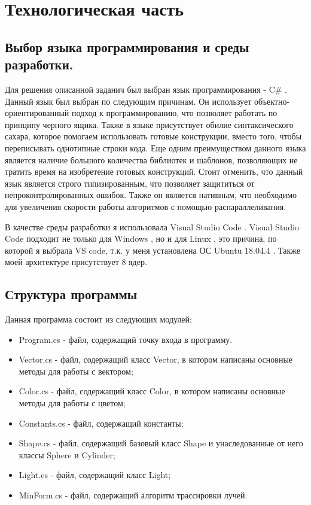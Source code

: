 \chapter{Технологическая часть}

\section{Выбор языка программирования и среды разработки.}

Для решения описанной заданич был выбран язык программирования - C\# \cite{Microsoft}.
Данный язык был выбран по следующим причинам.
Он использует объектно-ориентированный подход к программированию,
что позволяет работать по принципу черного ящика.
Также в языке присутствует обилие синтаксического сахара,
которое помогаем использовать готовые конструкции,
вместо того, чтобы переписывать однотипные строки кода.
Еще одним преимуществом данного языка является
наличие большого количества библиотек и шаблонов,
позволяющих не тратить время на изобретение готовых конструкций.
Стоит отменить, что данный язык является строго типизированным,
что позволяет защититься от непроконтролированных ошибок.
Также он является нативным, что необходимо
для увеличения скорости работы алгоритмов с помощью распараллеливания.

В качестве среды разработки я использовала Visual Studio Code \cite{Vs}.
Visual Studio Code подходит не только для  Windows \cite{Win},
но и для Linux \cite{Lin}, это причина,
по которой я выбрала VS code,
т.к. у меня установлена ОС Ubuntu 18.04.4 \cite{Ubuntu}.
Также моей архитектуре присутствует 8 ядер.

\section{Структура программы}

Данная программа состоит из следующих модулей:

\begin{itemize}
	\item Program.cs - файл, содержащий точку входа в программу.
	\item Vector.cs - файл, содержащий класс Vector, в котором
	      написаны основные методы для работы с вектором;
	\item Color.cs - файл, содержащий класс Color, в котором
	      написаны основные методы для работы с цветом;
	\item Constants.cs - файл, содержащий константы;
	\item Shape.cs - файл, содержащий базовый класс Shape
	      и унаследованные от него классы Sphere и Cylinder;
	\item Light.cs - файл, содержащий класс Light;
	\item MinForm.cs - файл, содержащий алгоритм трассировки лучей.
\end{itemize}

